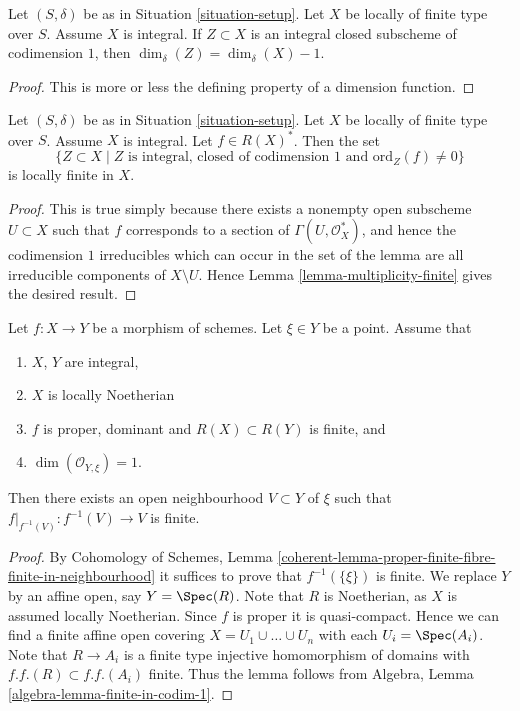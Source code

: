 \begin{lemma}
\label{lemma-divisor-delta-dimension}
Let $(S, \delta)$ be as in Situation \ref{situation-setup}.
Let $X$ be locally of finite type over $S$. Assume $X$ is
integral. If $Z \subset X$ is an integral closed subscheme
of codimension $1$, then $\dim_\delta(Z) = \dim_\delta(X) - 1$.
\end{lemma}

\begin{proof}
This is more or less the defining property of a dimension function.
\end{proof}

\begin{lemma}
\label{lemma-divisor-locally-finite}
Let $(S, \delta)$ be as in Situation \ref{situation-setup}.
Let $X$ be locally of finite type over $S$. Assume $X$ is
integral. Let $f \in R(X)^*$. Then the set
$$
\{Z \subset X \mid Z \text{ is integral, closed of codimension }1
\text{ and }\text{ord}_Z(f) \not = 0\}
$$
is locally finite in $X$.
\end{lemma}

\begin{proof}
This is true simply because there exists a nonempty open subscheme
$U \subset X$ such that $f$ corresponds to a section of
$\Gamma(U, \mathcal{O}_X^*)$, and hence the codimension $1$
irreducibles which can occur in the set of the lemma are all
irreducible components of $X \setminus U$.
Hence Lemma \ref{lemma-multiplicity-finite} gives the desired result.
\end{proof}

\begin{lemma}
\label{lemma-finite-in-codimension-one}
Let $f : X \to Y$ be a morphism of schemes.
Let $\xi \in Y$ be a point.
Assume that
\begin{enumerate}
\item $X$, $Y$ are integral,
\item $X$ is locally Noetherian
\item $f$ is proper, dominant and $R(X) \subset R(Y)$ is finite, and
\item $\dim(\mathcal{O}_{Y, \xi}) = 1$.
\end{enumerate}
Then there exists an open neighbourhood $V \subset Y$ of $\xi$
such that $f|_{f^{-1}(V)} : f^{-1}(V) \to V$ is finite.
\end{lemma}

\begin{proof}
By Cohomology of Schemes,
Lemma \ref{coherent-lemma-proper-finite-fibre-finite-in-neighbourhood}
it suffices to prove that $f^{-1}(\{\xi\})$ is finite.
We replace $Y$ by an affine open, say $Y = \Spec(R)$.
Note that $R$ is Noetherian, as $X$ is assumed locally Noetherian.
Since $f$ is proper it is quasi-compact. Hence we can find a finite
affine open covering $X = U_1 \cup \ldots \cup U_n$ with
each $U_i = \Spec(A_i)$. Note that $R \to A_i$ is a
finite type injective homomorphism of domains with
$f.f.(R) \subset f.f.(A_i)$ finite. Thus the lemma follows
from Algebra, Lemma \ref{algebra-lemma-finite-in-codim-1}.
\end{proof}


